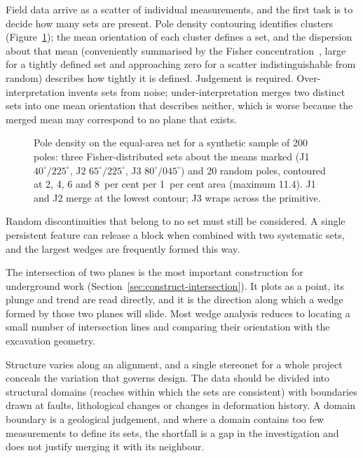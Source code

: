 Field data arrive as a scatter of individual measurements, and the first task
is to decide how many sets are present. Pole density contouring identifies
clusters (Figure~\ref{fig:pole-contouring}); the mean orientation of each cluster defines a set, and the
dispersion about that mean (conveniently summarised by the Fisher
concentration~\citep{fisher1953dispersion}, large for a tightly defined set
and approaching zero for a scatter indistinguishable from random)
describes how tightly it is defined. Judgement is required.
Over-interpretation invents sets from noise; under-interpretation merges two
distinct sets into one mean orientation that describes neither, which is worse
because the merged mean may correspond to no plane that exists.

\begin{figure}[htbp]
\centering
{}
\caption{Pole density on the equal-area net for a synthetic sample of 200 poles: three Fisher-distributed sets about the means marked (J1 $40^\circ/225^\circ$, J2 $65^\circ/225^\circ$, J3 $80^\circ/045^\circ$) and 20 random poles, contoured at 2, 4, 6 and 8~per cent per 1~per cent area (maximum 11.4). J1 and J2 merge at the lowest contour; J3 wraps across the primitive.}
\label{fig:pole-contouring}
\end{figure}

Random discontinuities that belong to no set must still be considered. A single persistent
feature can release a block when combined with two systematic sets,
and the largest wedges are frequently formed this way.

The intersection of two planes is the most important construction for
underground work (Section~\ref{sec:construct-intersection}). It plots as a point, its plunge and trend are read directly,
and it is the direction along which a wedge formed by those two planes will
slide. Most wedge analysis reduces to locating a small number of intersection
lines and comparing their orientation with the excavation geometry.

Structure varies along an alignment, and a single stereonet for a whole
project conceals the variation that governs design. The data should be divided
into structural domains (reaches within which the sets are consistent)
with boundaries drawn at faults, lithological changes or changes in
deformation history. A domain boundary is a geological judgement, and where a
domain contains too few measurements to define its sets, the shortfall is a
gap in the investigation and does not justify merging it with its neighbour.

